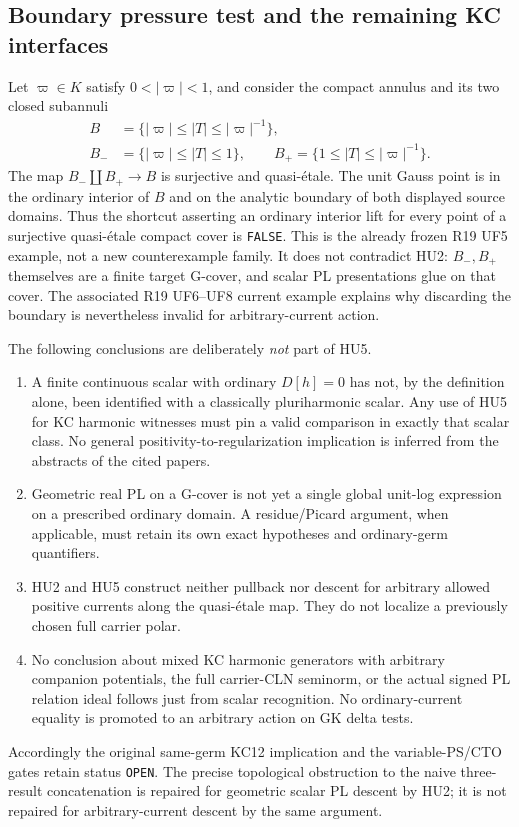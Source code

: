 \subsection{Boundary pressure test and the remaining KC interfaces}

Let $\varpi\in K$ satisfy $0<|\varpi|<1$, and consider the compact
annulus and its two closed subannuli
\[
 \begin{split}
 B&=\{|\varpi|\leq |T|\leq |\varpi|^{-1}\},\\
 B_-&=\{|\varpi|\leq |T|\leq1\},\qquad
 B_+=\{1\leq |T|\leq |\varpi|^{-1}\}.
 \end{split}                                                    \tag{HU6}
\]
The map $B_-\amalg B_+\to B$ is surjective and quasi-\'etale.
The unit Gauss point is in the ordinary interior of $B$ and on the
analytic boundary of both displayed source domains.  Thus the
shortcut asserting an ordinary interior lift for every point of a
surjective quasi-\'etale compact cover is \texttt{FALSE}.  This is
the already frozen R19 UF5 example, not a new counterexample family.
It does not contradict HU2: $B_-,B_+$ themselves are a finite
target G-cover, and scalar PL presentations glue on that cover.
The associated R19 UF6--UF8 current example explains why discarding
the boundary is nevertheless invalid for arbitrary-current action.

The following conclusions are deliberately \emph{not} part of HU5.
\begin{enumerate}
\item A finite continuous scalar with ordinary $D[h]=0$ has not,
by the definition alone, been identified with a classically
pluriharmonic scalar.  Any use of HU5 for KC harmonic witnesses must
pin a valid comparison in exactly that scalar class.  No general
positivity-to-regularization implication is inferred from the
abstracts of the cited papers.
\item Geometric real PL on a G-cover is not yet a single global
unit-log expression on a prescribed ordinary domain.  A
residue/Picard argument, when applicable, must retain its own exact
hypotheses and ordinary-germ quantifiers.
\item HU2 and HU5 construct neither pullback nor descent for
arbitrary allowed positive currents along the quasi-\'etale map.
They do not localize a previously chosen full carrier polar.
\item No conclusion about mixed KC harmonic generators with
arbitrary companion potentials, the full carrier-CLN seminorm, or
the actual signed PL relation ideal follows just from scalar
recognition.  No ordinary-current equality is promoted to an
arbitrary action on GK delta tests.
\end{enumerate}

Accordingly the original same-germ KC12 implication and the
variable-PS/CTO gates retain status \texttt{OPEN}.  The precise
topological obstruction to the naive three-result concatenation is
repaired for geometric scalar PL descent by HU2; it is not repaired
for arbitrary-current descent by the same argument.
